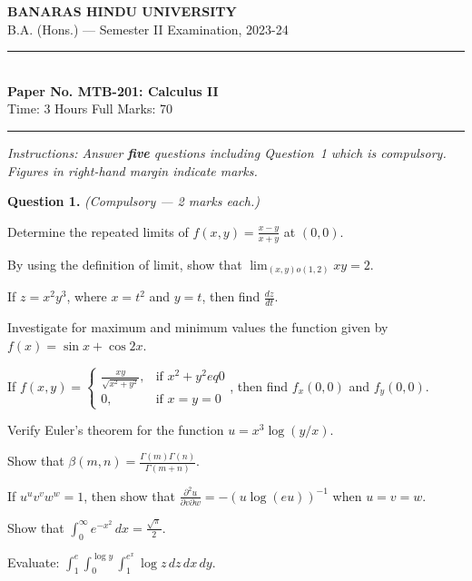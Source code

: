 \documentclass[11pt,a4paper]{article}
\begin{document}
\begin{center}
  {\large\bfseries BANARAS HINDU UNIVERSITY}\\[2pt]
  {\normalsize B.A. (Hons.) --- Semester II Examination, 2023-24}\\[6pt]
  \rule{0.8\linewidth}{0.5pt}\\[6pt]
  {\large\bfseries Paper No. MTB-201: Calculus II}\\[4pt]
  {\normalsize Time: 3 Hours \hfill Full Marks: 70}
\end{center}
\rule{\linewidth}{0.4pt}
\smallskip



\noindent   \textit{Instructions: Answer   \textbf{five} questions including Question~1 which is compulsory. Figures in right-hand margin indicate marks.}
\bigskip




\noindent   \textbf{Question 1.}   \textit{(Compulsory --- 2 marks each.)}

\begin{parts}
  \item Determine the repeated limits of $f(x, y) = \frac{x-y}{x+y}$ at $(0, 0)$.
  \item By using the definition of limit, show that $\lim_{(x,y)  o (1,2)} xy = 2$.
  \item If $z = x^2 y^3$, where $x = t^2$ and $y = t$, then find $\frac{dz}{dt}$.
  \item Investigate for maximum and minimum values the function given by $f(x) = \sin x + \cos 2x$.
  \item If $f(x,y) = 
\begin{cases} \frac{xy}{\sqrt{x^2+y^2}}, &  \text{if } x^2+y^2 
eq 0 \\ 0, &  \text{if } x=y=0 \end{cases}$, then find $f_x(0,0)$ and $f_y(0,0)$.
  \item Verify Euler's theorem for the function $u = x^3 \log(y/x)$.
  \item Show that $\beta(m, n) = \frac{\Gamma(m)\Gamma(n)}{\Gamma(m+n)}$.
  \item If $u^u v^v w^w = 1$, then show that $\frac{\partial^2 u}{\partial v \partial w} = -(u \log (eu))^{-1}$ when $u = v = w$.
  \item Show that $\int_0^\infty e^{-x^2} \, dx = \frac{\sqrt{\pi}}{2}$.
  \item Evaluate: $\int_1^e \int_0^{\log y} \int_1^{e^x} \log z \, dz \, dx \, dy$.
\end{parts}
\end{document}

